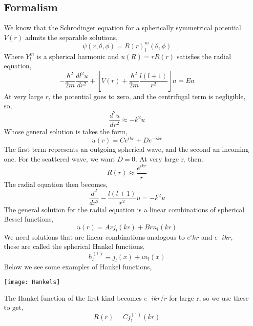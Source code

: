\subsection{Formalism}
We know that the Schrodinger equation for a spherically symmetrical potential $V(r)$ admits the separable solutions,
\begin{equation}
	\psi(r,\theta,\phi)=R(r)^m_l(\theta,\phi)
\end{equation}
Where $Y^m_l$ is a spherical harmonic and $u(R)=rR(r)$ satisfies the radial equation,
\begin{equation}
	-\frac{\hbar^2}{2m}\frac{dl^2 u}{d r^2} + \left[V(r) + \frac{\hbar^2}{2m}\frac{l(l+1)}{r^2}\right]u = Eu
\end{equation}
At very large $r$, the potential goes to zero, and the centrifugal term is negligible, so,
\begin{equation}
	\frac{d^2u}{dr^2}\approx-k^2u
\end{equation}
Whose general solution is takes the form,
\begin{equation}
	u(r)=Ce^{ikr}+De^{-ikr}
\end{equation}
The first term represents an outgoing spherical wave, and the second an incoming one. For the scattered wave, we want $D=0$. At very large r, then.
\begin{equation}
	R(r)\approx\frac{e^{ikr}}{r}
\end{equation}
The radial equation then becomes,
\begin{equation}
	\frac{d^2}{dr^2}-\frac{l(l+1)}{r^2}u=-k^2u
\end{equation}
The general solution for the radial equation is a linear combinations of spherical Bessel functions,
\begin{equation}
	u(r)=Arj_l(kr)+Brn_l(kr)
\end{equation}		
We need solutions that are linear combinations analogous to $e^ikr$ and $e^-ikr$, these are called the spherical Hankel functions,
\begin{equation}
	h^{(1)}_l\equiv j_l(x)+in_l(x)
\end{equation}
\newpage
Below we see some examples of Hankel functions,

\begin{center}
	\texttt{[image: Hankels]}
\end{center}
The Hankel function of the first kind becomes $e^-ikr/r$ for large r, so we use these to get,
\begin{equation}
	R(r)=Cj^{(1)}_l(kr)
\end{equation}
